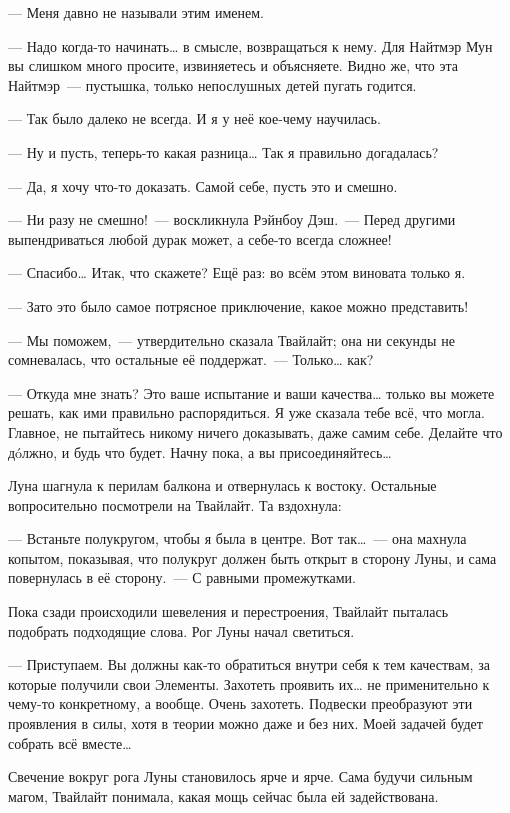 \documentclass[twoside,a5paper,12pt]{extbook}
\begin{document}
— Меня давно не называли этим именем.

— Надо когда-то начинать… в смысле, возвращаться к нему. Для Найтмэр Мун вы слишком много просите, извиняетесь и объясняете. Видно же, что эта Найтмэр — пустышка, только непослушных детей пугать годится.

— Так было далеко не всегда. И я у неё кое-чему научилась.

— Ну и пусть, теперь-то какая разница… Так я правильно догадалась?

— Да, я хочу что-то доказать. Самой себе, пусть это и смешно.

— Ни разу не смешно! — воскликнула Рэйнбоу Дэш. — Перед другими выпендриваться любой дурак может, а себе-то всегда сложнее!

— Спасибо… Итак, что скажете? Ещё раз: во всём этом виновата только я.

— Зато это было самое потрясное приключение, какое можно представить!

— Мы поможем, — утвердительно сказала Твайлайт; она ни секунды не сомневалась, что остальные её поддержат. — Только… как?

— Откуда мне знать? Это ваше испытание и ваши качества… только вы можете решать, как ими правильно распорядиться. Я уже сказала тебе всё, что могла. Главное, не пытайтесь никому ничего доказывать, даже самим себе. Делайте что дóлжно, и будь что будет. Начну пока, а вы присоединяйтесь…

Луна шагнула к перилам балкона и отвернулась к востоку. Остальные вопросительно посмотрели на Твайлайт. Та вздохнула:

— Встаньте полукругом, чтобы я была в центре. Вот так… — она махнула копытом, показывая, что полукруг должен быть открыт в сторону Луны, и сама повернулась в её сторону. — С равными промежутками.

Пока сзади происходили шевеления и перестроения, Твайлайт пыталась подобрать подходящие слова. Рог Луны начал светиться.

— Приступаем. Вы должны как-то обратиться внутри себя к тем качествам, за которые получили свои Элементы. Захотеть проявить их… не применительно к чему-то конкретному, а вообще. Очень захотеть. Подвески преобразуют эти проявления в силы, хотя в теории можно даже и без них. Моей задачей будет собрать всё вместе…

Свечение вокруг рога Луны становилось ярче и ярче. Сама будучи сильным магом, Твайлайт понимала, какая мощь сейчас была ей задействована.
\end{document}
